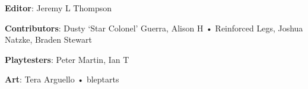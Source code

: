 \begin{description}

\item {\bfseries Editor}: Jeremy L Thompson

\item {\bfseries Contributors}: Dusty ‘Star Colonel’ Guerra, Alison H • Reinforced Legs, Joshua Natzke, Braden Stewart

\item {\bfseries Playtesters}: Peter Martin, Ian T

\item {\bfseries Art}: Tera Arguello • bleptarts

\end{description}

